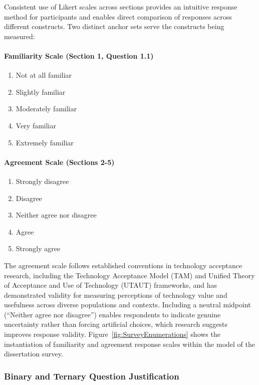Consistent use of Likert scales across sections provides an intuitive response method for participants and enables direct comparison of responses across different constructs. Two distinct anchor sets serve the constructs being measured:

\paragraph{Familiarity Scale (Section 1, Question 1.1)}
\begin{enumerate}
  \item Not at all familiar
  \item Slightly familiar
  \item Moderately familiar
  \item Very familiar
  \item Extremely familiar
\end{enumerate}

\paragraph{Agreement Scale (Sections 2-5)}
\begin{enumerate}
  \item Strongly disagree
  \item Disagree
  \item Neither agree nor disagree
  \item Agree
  \item Strongly agree
\end{enumerate}

The agreement scale follows established conventions in technology acceptance research, including the Technology Acceptance Model (TAM) and Unified Theory of Acceptance and Use of Technology (UTAUT) frameworks, and has demonstrated validity for measuring perceptions of technology value and usefulness across diverse populations and contexts. Including a neutral midpoint (``Neither agree nor disagree'') enables respondents to indicate genuine uncertainty rather than forcing artificial choices, which research suggests improves response validity. Figure~\ref{fig:SurveyEnumerations} shows the instantiation of familiarity and agreement response scales within the model of the dissertation survey.

\subsubsection{Binary and Ternary Question Justification}

